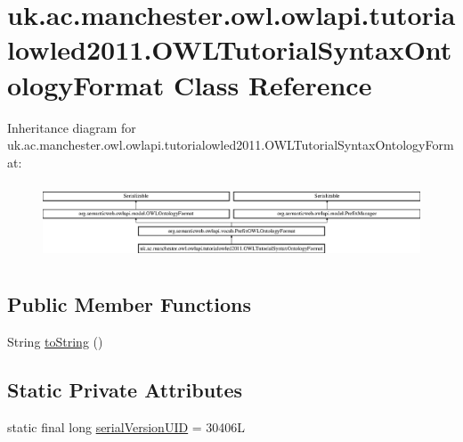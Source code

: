 \hypertarget{classuk_1_1ac_1_1manchester_1_1owl_1_1owlapi_1_1tutorialowled2011_1_1_o_w_l_tutorial_syntax_ontology_format}{\section{uk.\-ac.\-manchester.\-owl.\-owlapi.\-tutorialowled2011.\-O\-W\-L\-Tutorial\-Syntax\-Ontology\-Format Class Reference}
\label{classuk_1_1ac_1_1manchester_1_1owl_1_1owlapi_1_1tutorialowled2011_1_1_o_w_l_tutorial_syntax_ontology_format}
}
Inheritance diagram for uk.\-ac.\-manchester.\-owl.\-owlapi.\-tutorialowled2011.\-O\-W\-L\-Tutorial\-Syntax\-Ontology\-Format\-:\begin{figure}[H]
\begin{center}
\leavevmode
\includegraphics[height=2.295082cm]{classuk_1_1ac_1_1manchester_1_1owl_1_1owlapi_1_1tutorialowled2011_1_1_o_w_l_tutorial_syntax_ontology_format}
\end{center}
\end{figure}
\subsection*{Public Member Functions}
\begin{DoxyCompactItemize}
\item 
String \hyperlink{classuk_1_1ac_1_1manchester_1_1owl_1_1owlapi_1_1tutorialowled2011_1_1_o_w_l_tutorial_syntax_ontology_format_ab8c5dbb9164b38904094954459dce37a}{to\-String} ()
\end{DoxyCompactItemize}
\subsection*{Static Private Attributes}
\begin{DoxyCompactItemize}
\item 
static final long \hyperlink{classuk_1_1ac_1_1manchester_1_1owl_1_1owlapi_1_1tutorialowled2011_1_1_o_w_l_tutorial_syntax_ontology_format_a1f0941172373d594e0d78099d6c758eb}{serial\-Version\-U\-I\-D} = 30406\-L
\end{DoxyCompactItemize}
